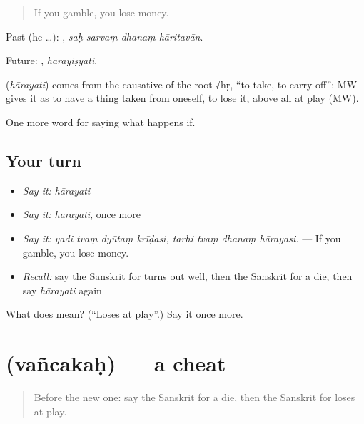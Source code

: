 \begin{quote}
If you gamble, you lose money.
\end{quote}

Past (he …):    , \emph{saḥ sarvaṃ dhanaṃ hāritavān}.

Future: , \emph{hārayiṣyati}.

\begin{cousinweb}
\textbf{} (\emph{hārayati}) comes from the causative of the root √hṛ, \textquotedblleft{}to take, to carry off\textquotedblright{}: MW gives it as to have a thing taken from oneself, to lose it, above all at play (MW).
\end{cousinweb}

\begin{grammarlens}[title={What you've built}]
One more word for saying what happens if.
\end{grammarlens}

\subsection*{Your turn}
\begin{itemize}
\raggedright
  \item \emph{Say it:} \emph{hārayati}
  \item \emph{Say it:} \emph{hārayati}, once more
  \item \emph{Say it:} \emph{yadi tvaṃ dyūtaṃ krīḍasi, tarhi tvaṃ dhanaṃ hārayasi.} — If you gamble, you lose money.
  \item \emph{Recall:} say the Sanskrit for turns out well, then the Sanskrit for a die, then say \emph{hārayati} again
\end{itemize}

\begin{tcolorbox}[breakable,colback=teal!4,colframe=teal!35!black,title={Before you move on}]
What does  mean? (\textquotedblleft{}Loses at play\textquotedblright{}.) Say it once more.
\end{tcolorbox}
\section[\texorpdfstring{\sk{वञ्चकः} (vañcakaḥ)}{वञ्चकः (vañcakaḥ)}]{ (vañcakaḥ) — a cheat}

\label{lesson:SA-C537-vancakah}



\begin{quote}
Before the new one: say the Sanskrit for a die, then the Sanskrit for loses at play.
\end{quote}

